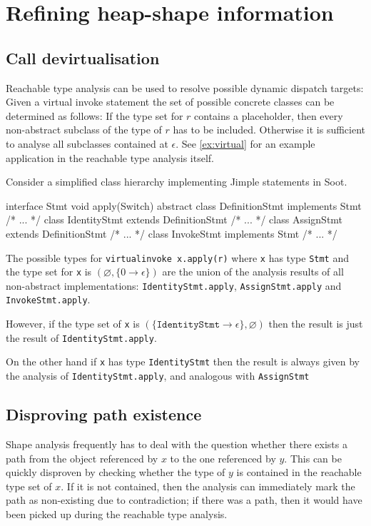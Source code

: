 \section{Refining heap-shape information}
\label{chap:refining}
\subsection{Call devirtualisation}
Reachable type analysis can be used to resolve possible dynamic dispatch targets: Given a virtual invoke statement  the set of possible concrete classes can be determined as follows:
If the type set for $r$ contains a placeholder, then every non-abstract subclass of the type of $r$ has to be included. Otherwise it is sufficient to analyse all subclasses contained at $\epsilon$. See \cref{ex:virtual} for an example application in the reachable type analysis itself.
\begin{example}
\label{ex:virtual}
Consider a simplified class hierarchy implementing Jimple statements in Soot.
\begin{javacode}
interface Stmt { void apply(Switch) }
abstract class DefinitionStmt implements Stmt { /* ... */ }
class IdentityStmt extends DefinitionStmt { /* ... */ }
class AssignStmt extends DefinitionStmt { /* ... */ }
class InvokeStmt implements Stmt { /* ... */ }
\end{javacode}
The possible types for \texttt{virtualinvoke x.apply(r)} where \texttt{x} has type \texttt{Stmt} and the type set for \texttt{x} is $(\varnothing, \{ 0 \to \epsilon \})$ are the union of the analysis results of all non-abstract implementations: \texttt{IdentityStmt.apply}, \texttt{AssignStmt.apply} and \texttt{InvokeStmt.apply}.

However, if the type set of \texttt{x} is $(\{ \mathtt{IdentityStmt} \to \epsilon \}, \varnothing)$ then the result is just the result of \texttt{IdentityStmt.apply}.

On the other hand if \texttt{x} has type \texttt{IdentityStmt} then the result is always given by the analysis of \texttt{IdentityStmt.apply}, and analogous with \texttt{AssignStmt}
\end{example}

\subsection{Disproving path existence}
Shape analysis frequently has to deal with the question whether there exists a path from the object referenced by $x$ to the one referenced by $y$. This can be quickly disproven by checking whether the type of $y$ is contained in the reachable type set of $x$. If it is not contained, then the analysis can immediately mark the path as non-existing due to contradiction; if there was a path, then it would have been picked up during the reachable type analysis.

